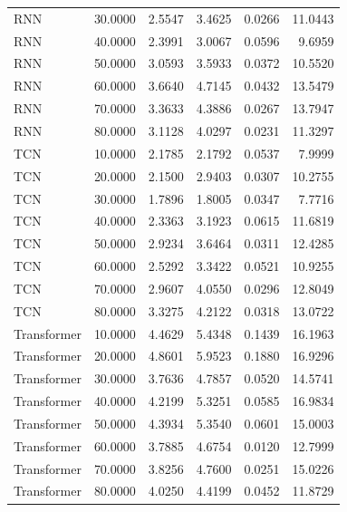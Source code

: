 \begin{tabular}{lrrrrr}
RNN & 30.0000 & 2.5547 & 3.4625 & 0.0266 & 11.0443 \\
RNN & 40.0000 & 2.3991 & 3.0067 & 0.0596 & 9.6959 \\
RNN & 50.0000 & 3.0593 & 3.5933 & 0.0372 & 10.5520 \\
RNN & 60.0000 & 3.6640 & 4.7145 & 0.0432 & 13.5479 \\
RNN & 70.0000 & 3.3633 & 4.3886 & 0.0267 & 13.7947 \\
RNN & 80.0000 & 3.1128 & 4.0297 & 0.0231 & 11.3297 \\
TCN & 10.0000 & 2.1785 & 2.1792 & 0.0537 & 7.9999 \\
TCN & 20.0000 & 2.1500 & 2.9403 & 0.0307 & 10.2755 \\
TCN & 30.0000 & 1.7896 & 1.8005 & 0.0347 & 7.7716 \\
TCN & 40.0000 & 2.3363 & 3.1923 & 0.0615 & 11.6819 \\
TCN & 50.0000 & 2.9234 & 3.6464 & 0.0311 & 12.4285 \\
TCN & 60.0000 & 2.5292 & 3.3422 & 0.0521 & 10.9255 \\
TCN & 70.0000 & 2.9607 & 4.0550 & 0.0296 & 12.8049 \\
TCN & 80.0000 & 3.3275 & 4.2122 & 0.0318 & 13.0722 \\
Transformer & 10.0000 & 4.4629 & 5.4348 & 0.1439 & 16.1963 \\
Transformer & 20.0000 & 4.8601 & 5.9523 & 0.1880 & 16.9296 \\
Transformer & 30.0000 & 3.7636 & 4.7857 & 0.0520 & 14.5741 \\
Transformer & 40.0000 & 4.2199 & 5.3251 & 0.0585 & 16.9834 \\
Transformer & 50.0000 & 4.3934 & 5.3540 & 0.0601 & 15.0003 \\
Transformer & 60.0000 & 3.7885 & 4.6754 & 0.0120 & 12.7999 \\
Transformer & 70.0000 & 3.8256 & 4.7600 & 0.0251 & 15.0226 \\
Transformer & 80.0000 & 4.0250 & 4.4199 & 0.0452 & 11.8729 \\
\bottomrule
\end{tabular}
